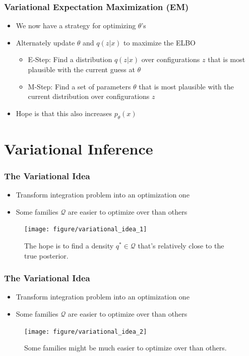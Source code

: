 \documentclass[10pt,mathserif]{beamer}
\begin{document}
\begin{frame}
  \frametitle{Variational Expectation Maximization (EM)}
  \begin{itemize}
  \item We now have a strategy for optimizing $\theta$'s
  \item Alternately update $\theta$ and $q\left(z \vert x\right)$ to maximize
    the ELBO
    \begin{itemize}
    \item E-Step: Find a distribution $q\left(z \vert x\right)$ over
      configurations $z$ that is most plausible with the current guess at
      $\theta$
    \item M-Step: Find a set of parameters $\theta$ that is most plausible with
      the current distribution over configurations $z$
    \end{itemize}
  \item Hope is that this also increases $p_{\theta}\left(x\right)$
  \end{itemize}
\end{frame}

\section{Variational Inference}
\label{sec:introduction}

\begin{frame}
  \frametitle{The Variational Idea}
  \begin{itemize}
  \item Transform integration problem into an optimization one
  \item Some families $\mathcal{Q}$ are easier to optimize over than others
  \end{itemize}
\begin{figure}[ht]
  \centering
  \texttt{[image: figure/variational\_idea\_1]}
  \caption{The hope is to find a density $q^{\ast} \in \mathcal{Q}$ that's
    relatively close to the true posterior. \label{fig:variational_idea_1} }
\end{figure}
\end{frame}

\begin{frame}
  \frametitle{The Variational Idea}
  \begin{itemize}
  \item Transform integration problem into an optimization one
  \item Some families $\mathcal{Q}$ are easier to optimize over than others
  \end{itemize}
\begin{figure}[ht]
  \centering
  \texttt{[image: figure/variational\_idea\_2]}
  \caption{Some families might be much easier to optimize over than others.
    \label{fig:variational_idea_2} }
\end{figure}
\end{frame}
\end{document}

